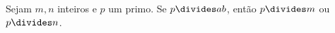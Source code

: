 \begin{lemma}
\label{elm}
    Sejam $m,n$ inteiros e $p$ um primo. Se $p\divides a b$, então $p\divides m$ ou $p\divides n$. 
\end{lemma}
